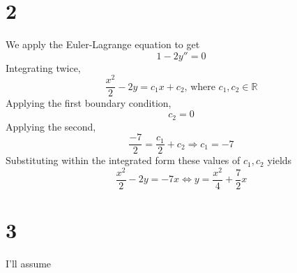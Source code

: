 \documentclass{article}
\begin{document}
\section*{2}
We apply the Euler-Lagrange equation to get
\[1-2y''=0\]
Integrating twice,
\[\frac{x^2}{2}-2y=c_1x+c_2\textrm{, where }c_1,c_2\in\mathbb{R}\]
Applying the first boundary condition,
\[c_2 = 0\]
Applying the second,
\[\frac{-7}{2}=\frac{c_1}{2}+c_2\Rightarrow c_1 = -7\]
Substituting within the integrated form these values of $c_1,c_2$ yields
\[\frac{x^2}{2}-2y=-7x\Leftrightarrow y =\frac{x^2}{4}+\frac{7}{2}x\]
\section*{3}
I'll assume 
  
\end{document}
